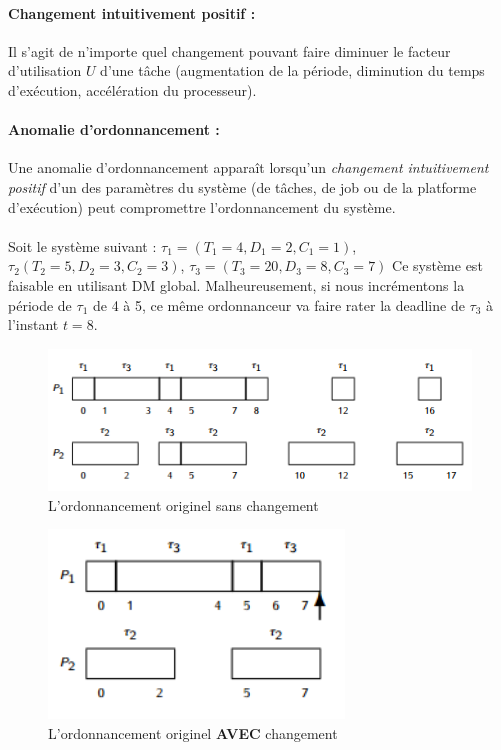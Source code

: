   \paragraph{Changement intuitivement positif : } Il s'agit de n'importe quel changement 
  pouvant faire diminuer le facteur d'utilisation $U$ d'une tâche (augmentation de la 
  période, diminution du temps d'exécution, accélération du processeur).

  \paragraph{Anomalie d'ordonnancement : } Une anomalie d'ordonnancement apparaît 
  lorsqu'un \textit{changement intuitivement positif} d'un des paramètres du système (de 
  tâches, de job ou de la platforme d'exécution) peut compromettre l'ordonnancement du 
  système.
  
  \paragraph{} Soit le système suivant : $\tau_{1} = (T_{1} = 4, D_{1} = 2, C_{1} = 
   1)$, 
   $\tau_{2} (T_{2} =5, D_{2} = 3, C_{2} = 3)$, $\tau_{3} = (T_{3} = 20, D_{3} = 8, 
   C_{3} = 7)$ Ce système est faisable en utilisant DM global. Malheureusement, si nous 
   incrémentons la période de $\tau_{1}$ de 4 à 5, ce même ordonnanceur va faire rater 
   la deadline de $\tau_{3}$ à l'instant $t = 8$.
   \begin{figure}[H]
      \centering
      \includegraphics[width=\textwidth]{img_3_2__0}
      \caption{L'ordonnancement originel sans changement}
   \end{figure}
   \begin{figure}[H]
      \centering
      \includegraphics[width=0.7\textwidth]{img_3_2__1}
      \caption{L'ordonnancement originel \textbf{AVEC} changement}
   \end{figure}
   

